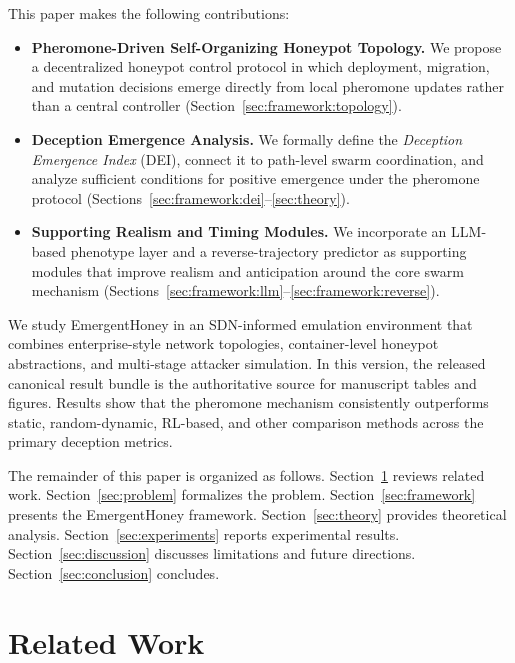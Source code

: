 \documentclass[review,3p,twocolumn]{elsarticle}
\begin{document}
This paper makes the following contributions:

\begin{itemize}[leftmargin=*]
\item \textbf{Pheromone-Driven Self-Organizing Honeypot Topology.} We propose a decentralized honeypot control protocol in which deployment, migration, and mutation decisions emerge directly from local pheromone updates rather than a central controller (Section~\ref{sec:framework:topology}).

\item \textbf{Deception Emergence Analysis.} We formally define the \emph{Deception Emergence Index} (DEI), connect it to path-level swarm coordination, and analyze sufficient conditions for positive emergence under the pheromone protocol (Sections~\ref{sec:framework:dei}--\ref{sec:theory}).

\item \textbf{Supporting Realism and Timing Modules.} We incorporate an LLM-based phenotype layer and a reverse-trajectory predictor as supporting modules that improve realism and anticipation around the core swarm mechanism (Sections~\ref{sec:framework:llm}--\ref{sec:framework:reverse}).
\end{itemize}

We study EmergentHoney in an SDN-informed emulation environment that combines enterprise-style network topologies, container-level honeypot abstractions, and multi-stage attacker simulation. In this version, the released canonical result bundle is the authoritative source for manuscript tables and figures. Results show that the pheromone mechanism consistently outperforms static, random-dynamic, RL-based, and other comparison methods across the primary deception metrics.

The remainder of this paper is organized as follows. Section~\ref{sec:related} reviews related work. Section~\ref{sec:problem} formalizes the problem. Section~\ref{sec:framework} presents the EmergentHoney framework. Section~\ref{sec:theory} provides theoretical analysis. Section~\ref{sec:experiments} reports experimental results. Section~\ref{sec:discussion} discusses limitations and future directions. Section~\ref{sec:conclusion} concludes.


\section{Related Work}
\label{sec:related}
\end{document}
